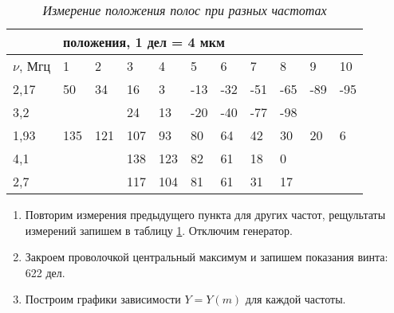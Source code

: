 \documentclass[a4paper,12pt]{article}
\begin{document}
\FloatBarrier
\begin{table}[!h]
    \centering
    \caption{\textit{Измерение положения полос при разных частотах}}
    \begin{tabular}{|l|llllllllll|}
    \hline
                     & \multicolumn{10}{l|}{положения, 1 дел = 4 мкм} \\ \hline
        $\nu$, Мгц & \multicolumn{1}{l|}{1}   & \multicolumn{1}{l|}{2}   & \multicolumn{1}{l|}{3}   & \multicolumn{1}{l|}{4}   & \multicolumn{1}{l|}{5}   & \multicolumn{1}{l|}{6}   & \multicolumn{1}{l|}{7}   & \multicolumn{1}{l|}{8}   & \multicolumn{1}{l|}{9}   & 10  \\ \hline
        2,17         & \multicolumn{1}{l|}{50}  & \multicolumn{1}{l|}{34}  & \multicolumn{1}{l|}{16}  & \multicolumn{1}{l|}{3}   & \multicolumn{1}{l|}{-13} & \multicolumn{1}{l|}{-32} & \multicolumn{1}{l|}{-51} & \multicolumn{1}{l|}{-65} & \multicolumn{1}{l|}{-89} & -95 \\ \hline
        3,2          & \multicolumn{1}{l|}{}    & \multicolumn{1}{l|}{}    & \multicolumn{1}{l|}{24}  & \multicolumn{1}{l|}{13}  & \multicolumn{1}{l|}{-20} & \multicolumn{1}{l|}{-40} & \multicolumn{1}{l|}{-77} & \multicolumn{1}{l|}{-98} & \multicolumn{1}{l|}{}    &     \\ \hline
        1,93         & \multicolumn{1}{l|}{135} & \multicolumn{1}{l|}{121} & \multicolumn{1}{l|}{107} & \multicolumn{1}{l|}{93}  & \multicolumn{1}{l|}{80}  & \multicolumn{1}{l|}{64}  & \multicolumn{1}{l|}{42}  & \multicolumn{1}{l|}{30}  & \multicolumn{1}{l|}{20}  & 6   \\ \hline
        4,1          & \multicolumn{1}{l|}{}    & \multicolumn{1}{l|}{}    & \multicolumn{1}{l|}{138} & \multicolumn{1}{l|}{123} & \multicolumn{1}{l|}{82}  & \multicolumn{1}{l|}{61}  & \multicolumn{1}{l|}{18}  & \multicolumn{1}{l|}{0}   & \multicolumn{1}{l|}{}    &     \\ \hline
        2,7          & \multicolumn{1}{l|}{}    & \multicolumn{1}{l|}{}    & \multicolumn{1}{l|}{117} & \multicolumn{1}{l|}{104} & \multicolumn{1}{l|}{81}  & \multicolumn{1}{l|}{61}  & \multicolumn{1}{l|}{31}  & \multicolumn{1}{l|}{17}  & \multicolumn{1}{l|}{}    &     \\ \hline
    \end{tabular}
    \label{table:1}
\end{table}


\begin{enumerate}[resume]
    \item Повторим измерения предыдущего пункта для других частот, рещультаты измерений запишем в таблицу \ref{table:1}. Отключим генератор.
    \item Закроем проволочкой центральный максимум и запишем показания винта: 622 дел.
    \item Построим графики зависимости $Y = Y(m)$ для каждой частоты.
\end{enumerate}
\end{document}
